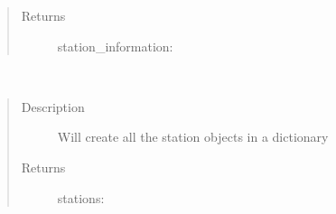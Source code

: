 \documentclass[letterpaper,10pt,english]{sphinxmanual}
\begin{document}
\begin{fulllineitems}
\begin{fulllineitems}
\begin{quote}
\begin{description}
\item[{Returns}] \leavevmode
\sphinxAtStartPar
station\_information: 

\end{description}\end{quote}

\end{fulllineitems}


\begin{fulllineitems}
\label{\detokenize{DwdDataPrep:DwdDataPrep.Reader.read_station_list}}~\begin{quote}\begin{description}
\item[{Description}] \leavevmode
\sphinxAtStartPar
Will create all the station objects in a dictionary

\item[{Returns}] \leavevmode
\sphinxAtStartPar
stations: 

\end{description}\end{quote}

\end{fulllineitems}


\end{fulllineitems}

\end{document}
